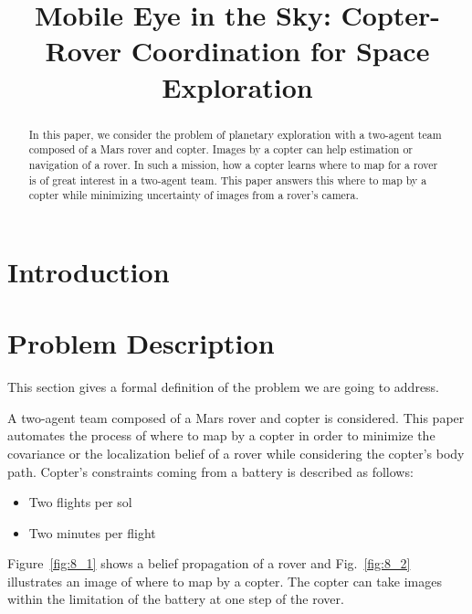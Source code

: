 \documentclass[conference]{IEEEtran}
\begin{document}
\title{\huge Mobile Eye in the Sky: Copter-Rover Coordination for Space Exploration}


\maketitle

\begin{abstract}
In this paper, we consider the problem of planetary exploration with a two-agent team composed of a Mars rover and copter. Images by a copter can help estimation or navigation of a rover. In such a mission, how a copter learns where to map for a rover is of great interest in a two-agent team. 
This paper answers this where to map by a copter while minimizing uncertainty of images from a rover’s camera.
\end{abstract}

\IEEEpeerreviewmaketitle

\section{Introduction}


\section{Problem Description}
This section gives a formal definition of the problem we are going to address. 

A two-agent team composed of a Mars rover and copter is considered. This paper automates the process of where to map by a copter in order to minimize the covariance or the localization belief of a rover while considering the copter’s body path.
Copter’s constraints coming from a battery is described as follows:
\begin{itemize}
    \item Two flights per sol
    \item Two minutes per flight
\end{itemize}
 Figure~\ref{fig:8_1} shows a belief propagation of a rover and Fig.~\ref{fig:8_2} illustrates an image of where to map by a copter. The copter can take images within the limitation of the battery at one step of the rover.
 
\end{document}
